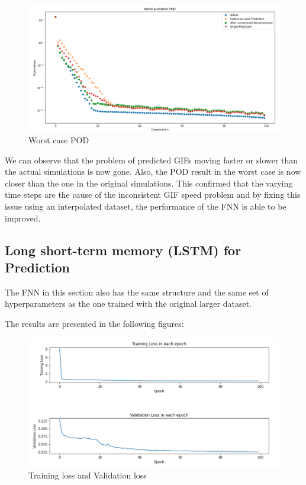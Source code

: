 \begin{figure}[H]
    \caption{Worst case POD}
    \includegraphics[scale=0.5]{Report LaTeX/figures/mantle_convection_images/larger_dataset_interpolated/FNN_Worst_POD.png}
\end{figure}

We can observe that the problem of predicted GIFs moving faster or slower than the actual simulations is now gone. Also, the POD result in the worst case is now closer than the one in the  original simulations. This confirmed that the varying time steps are the cause of the inconsistent GIF speed problem and by fixing this issue using an interpolated dataset, the performance of the FNN is able to be improved.


\subsection{Long short-term memory (LSTM) for Prediction}

The FNN in this section also has the same structure and the same set of hyperparameters as the one trained with the original larger dataset.

The results are presented in the following figures:

\begin{figure}[H]
    \caption{Training loss and Validation loss}
    \includegraphics[scale=0.6]{Report LaTeX/figures/mantle_convection_images/larger_dataset_interpolated/LSTM_trainingData.png}
\end{figure}


